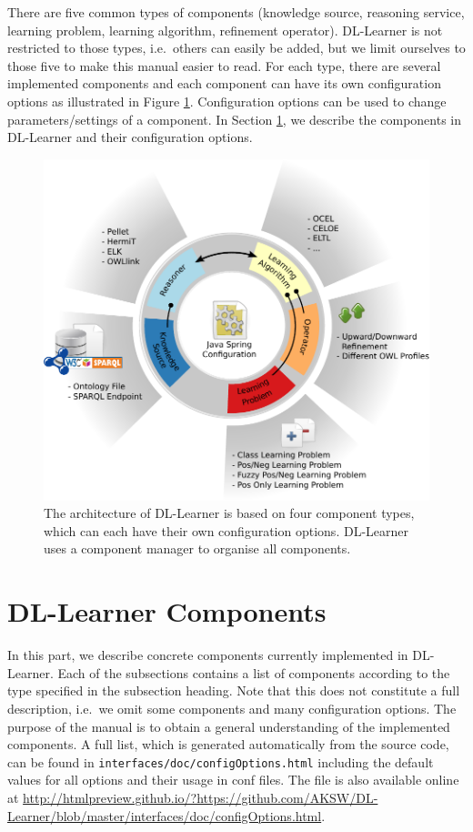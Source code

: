\documentclass[a4paper,12pt]{scrartcl}
\begin{document}
There are five common types of components (knowledge source, reasoning service, learning problem, learning algorithm, refinement operator). DL-Learner is not restricted to those types, i.e.~others can easily be added, but we limit ourselves to those five to make this manual easier to read. For each type, there are several implemented components and each component can have its own configuration options as illustrated in Figure \ref{fig:components}. Configuration options can be used to change parameters/settings of a component. In Section \ref{sec:components}, we describe the components in DL-Learner and their configuration options.

\begin{figure}[t]
  \centering
  \includegraphics[width=.70\textwidth]{../../../../images/components.pdf}
  \caption{The architecture of DL-Learner is based on four component types, which can each have their own configuration options. DL-Learner uses a component manager to organise all components.}
  \label{fig:components}
\end{figure}

\section{DL-Learner Components}
\label{sec:components}

In this part, we describe concrete components currently implemented in DL-Learner. Each of the subsections contains a list of components according to the type specified in the subsection heading. Note that this does not constitute a full description, i.e.~we omit some components and many configuration options. The purpose of the manual is to obtain a general understanding of the implemented components. A full list, which is generated automatically from the source code, can be found in \verb|interfaces/doc/configOptions.html| including the default values for all options and their usage in conf files. The file is also available online at \url{http://htmlpreview.github.io/?https://github.com/AKSW/DL-Learner/blob/master/interfaces/doc/configOptions.html}.
\end{document}
